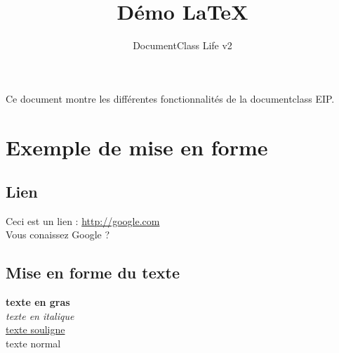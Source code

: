 \documentclass{life-fr}
\begin{document}
\title{Démo LaTeX}
\subtitle{DocumentClass Life v2}

\summary
{
  Ce document montre les différentes fonctionnalités de la
  documentclass EIP.
}

\maketitle

\tableofcontents

 \chapter{Exemple de mise en forme}

   \section{Lien}
     Ceci est un lien :
     \url{http://google.com}\\

     Vous conaissez Google ?

   \section{Mise en forme du texte}
     \textbf{texte en gras}\\
     \textit{texte en italique}\\
     \underline{texte souligne}\\
     texte normal
\end{document}
